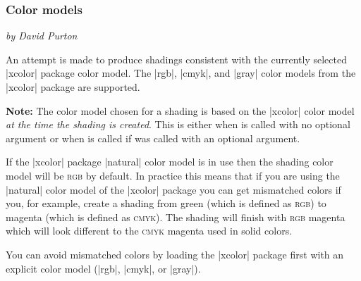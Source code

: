 \subsubsection{Color models}

\noindent\emph{by David Purton}

An attempt is made to produce shadings consistent with the currently selected
|xcolor| package color model. The |rgb|, |cmyk|, and |gray| color models from
the |xcolor| package are supported.

\textbf{Note:} The color model chosen for a shading is based on the |xcolor|
color model \emph{at the time the shading is created}. This is either when
 is called with no optional argument or when
 is called if  was called with an
optional argument.

If the |xcolor| package |natural| color model is in use then the shading color
model will be \textsc{rgb} by default. In practice this means that if you are
using the |natural| color model of the |xcolor| package you can get mismatched
colors if you, for example, create a shading from green (which is defined as
\textsc{rgb}) to magenta (which is defined as \textsc{cmyk}). The shading will
finish with \textsc{rgb} magenta which will look different to the
\textsc{cmyk} magenta used in solid colors.

You can avoid mismatched colors by loading the |xcolor| package first with an
explicit color model (|rgb|, |cmyk|, or |gray|).

\begin{codeexample}
\end{codeexample}

